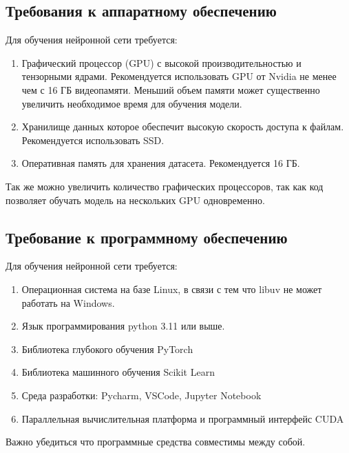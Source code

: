\documentclass[../part_2.tex]{subfiles}
\begin{document}
\subsection{Требования к аппаратному обеспечению}
\par Для обучения нейронной сети требуется:
\begin{enumerate}
    \item Графический процессор (GPU) с высокой производительностью и тензорными ядрами. Рекомендуется использовать GPU от Nvidia не менее чем с 16 ГБ видеопамяти. Меньший объем памяти может существенно увеличить необходимое время для обучения модели.
    \item Хранилище данных которое обеспечит высокую скорость доступа к файлам. Рекомендуется использовать SSD.
    \item Оперативная память для хранения датасета. Рекомендуется 16 ГБ.
\end{enumerate}
\par Так же можно увеличить количество графических процессоров, так как код позволяет обучать модель на нескольких GPU одновременно.
\subsection{Требование к программному обеспечению}
\par Для обучения нейронной сети требуется:
\begin{enumerate}
    \item Операционная система на базе Linux, в связи с тем что libuv не может работать на Windows.
    \item Язык программирования python 3.11 или выше.
    \item Библиотека глубокого обучения PyTorch
    \item Библиотека машинного обучения Scikit Learn
    \item Среда разработки: Pycharm, VSCode, Jupyter Notebook
    \item Параллельная вычислительная платформа и программный интерфейс CUDA
\end{enumerate}
\par Важно убедиться что программные средства совместимы между собой.
\end{document}
